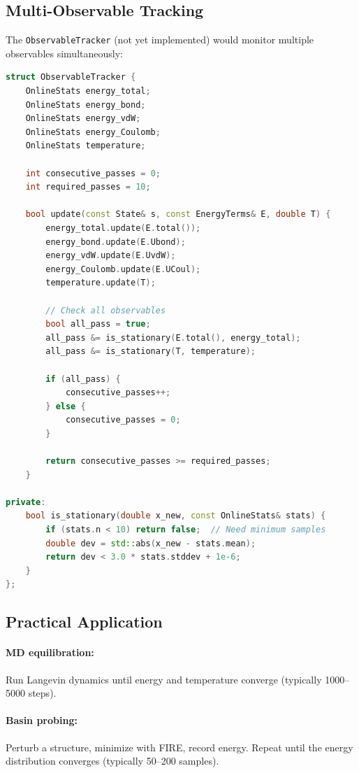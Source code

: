 \documentclass[11pt]{article}
\begin{document}
\subsection{Multi-Observable Tracking}

The \texttt{ObservableTracker} (not yet implemented) would monitor multiple observables simultaneously:

\begin{lstlisting}[language=C++]
struct ObservableTracker {
    OnlineStats energy_total;
    OnlineStats energy_bond;
    OnlineStats energy_vdW;
    OnlineStats energy_Coulomb;
    OnlineStats temperature;
    
    int consecutive_passes = 0;
    int required_passes = 10;
    
    bool update(const State& s, const EnergyTerms& E, double T) {
        energy_total.update(E.total());
        energy_bond.update(E.Ubond);
        energy_vdW.update(E.UvdW);
        energy_Coulomb.update(E.UCoul);
        temperature.update(T);
        
        // Check all observables
        bool all_pass = true;
        all_pass &= is_stationary(E.total(), energy_total);
        all_pass &= is_stationary(T, temperature);
        
        if (all_pass) {
            consecutive_passes++;
        } else {
            consecutive_passes = 0;
        }
        
        return consecutive_passes >= required_passes;
    }
    
private:
    bool is_stationary(double x_new, const OnlineStats& stats) {
        if (stats.n < 10) return false;  // Need minimum samples
        double dev = std::abs(x_new - stats.mean);
        return dev < 3.0 * stats.stddev + 1e-6;
    }
};
\end{lstlisting}

\subsection{Practical Application}

\paragraph{MD equilibration:} Run Langevin dynamics until energy and temperature converge (typically 1000--5000 steps).

\paragraph{Basin probing:} Perturb a structure, minimize with FIRE, record energy. Repeat until the energy distribution converges (typically 50--200 samples).
\end{document}
